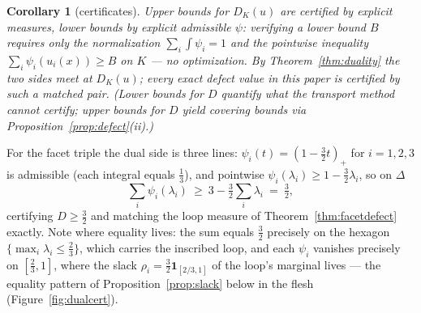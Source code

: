 \documentclass[11pt,reqno]{amsart}
\theoremstyle{plain}
\newtheorem{corollary}[theorem]{Corollary}
\theoremstyle{definition}
\theoremstyle{remark}
\begin{document}
\begin{corollary}[certificates]\label{cor:certificates}
Upper bounds for $D_K(u)$ are certified by explicit measures, lower bounds by
explicit admissible $\psi$: verifying a lower bound $B$ requires only the
normalization $\sum_i\int\psi_i=1$ and the pointwise inequality
$\sum_i\psi_i(u_i(x))\ge B$ on $K$ --- no optimization. By
Theorem~\ref{thm:duality} the two sides meet at $D_K(u)$; every exact defect
value in this paper is certified by such a matched pair. (Lower bounds for
$D$ quantify what the transport method \emph{cannot} certify; upper bounds
for $D$ yield covering bounds via Proposition~\ref{prop:defect}(ii).)
\end{corollary}

For the facet triple the dual side is three lines:
$\psi_i(t)=(1-\tfrac32t)_+$ for $i=1,2,3$ is admissible (each integral equals
$\tfrac13$), and pointwise $\psi_i(\lambda_i)\ge1-\tfrac32\lambda_i$, so on
$\Delta$
\[
\textstyle\sum_i\psi_i(\lambda_i)\ \ge\ 3-\tfrac32\sum_i\lambda_i\ =\
\tfrac32 ,
\]
certifying $D\ge\tfrac32$ and matching the loop measure of
Theorem~\ref{thm:facetdefect} exactly. Note where equality lives: the sum
equals $\tfrac32$ precisely on the hexagon
$\{\max_i\lambda_i\le\tfrac23\}$, which carries the inscribed loop, and each
$\psi_i$ vanishes precisely on $[\tfrac23,1]$, where the slack
$\rho_i=\tfrac32\mathbf1_{[2/3,1]}$ of the loop's marginal lives --- the
equality pattern of Proposition~\ref{prop:slack} below in the flesh
(Figure~\ref{fig:dualcert}).
\end{document}
